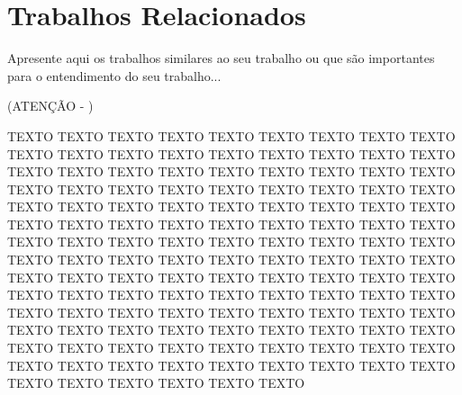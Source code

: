 \chapter{Trabalhos Relacionados}
\label{cap:trabalhos:relacionados}

Apresente aqui os trabalhos similares ao seu trabalho ou que são importantes para o entendimento do seu trabalho...

(ATENÇÃO - )


TEXTO TEXTO TEXTO TEXTO TEXTO TEXTO TEXTO TEXTO TEXTO TEXTO TEXTO TEXTO TEXTO TEXTO TEXTO TEXTO TEXTO TEXTO TEXTO TEXTO TEXTO TEXTO TEXTO TEXTO TEXTO TEXTO TEXTO TEXTO TEXTO TEXTO TEXTO TEXTO TEXTO TEXTO TEXTO TEXTO TEXTO TEXTO TEXTO TEXTO TEXTO TEXTO TEXTO TEXTO TEXTO TEXTO TEXTO TEXTO TEXTO TEXTO TEXTO TEXTO TEXTO TEXTO TEXTO TEXTO TEXTO TEXTO TEXTO TEXTO TEXTO TEXTO TEXTO TEXTO TEXTO TEXTO TEXTO TEXTO TEXTO TEXTO TEXTO TEXTO TEXTO TEXTO TEXTO TEXTO TEXTO TEXTO TEXTO TEXTO TEXTO TEXTO TEXTO TEXTO TEXTO TEXTO TEXTO TEXTO TEXTO TEXTO TEXTO TEXTO TEXTO TEXTO TEXTO TEXTO TEXTO TEXTO TEXTO TEXTO TEXTO TEXTO TEXTO TEXTO TEXTO TEXTO TEXTO TEXTO TEXTO TEXTO TEXTO TEXTO TEXTO TEXTO TEXTO TEXTO TEXTO TEXTO TEXTO TEXTO TEXTO TEXTO TEXTO TEXTO TEXTO TEXTO TEXTO TEXTO TEXTO TEXTO TEXTO TEXTO

